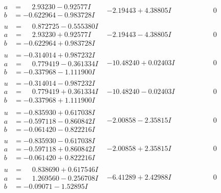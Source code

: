\documentclass[1p]{elsarticle_modified}
\theoremstyle{definition}
\begin{document}
$$\begin{array}{c|c|c}
\begin{aligned}
a &= \phantom{-}2.93230 - 0.92577 I \\
b &= -0.622964 - 0.983728 I\end{aligned}
 & -2.19443 + 4.38805 I & \phantom{-0.000000 } 0 \\ \hline\begin{aligned}
u &= \phantom{-}0.872725 - 0.555380 I \\
a &= \phantom{-}2.93230 + 0.92577 I \\
b &= -0.622964 + 0.983728 I\end{aligned}
 & -2.19443 - 4.38805 I & \phantom{-0.000000 } 0 \\ \hline\begin{aligned}
u &= -0.314014 + 0.987232 I \\
a &= \phantom{-}0.779419 - 0.361334 I \\
b &= -0.337968 - 1.111900 I\end{aligned}
 & -10.48240 + 0.02403 I & \phantom{-0.000000 } 0 \\ \hline\begin{aligned}
u &= -0.314014 - 0.987232 I \\
a &= \phantom{-}0.779419 + 0.361334 I \\
b &= -0.337968 + 1.111900 I\end{aligned}
 & -10.48240 - 0.02403 I & \phantom{-0.000000 } 0 \\ \hline\begin{aligned}
u &= -0.835930 + 0.617038 I \\
a &= -0.597118 - 0.860842 I \\
b &= -0.061420 - 0.822216 I\end{aligned}
 & -2.00858 - 2.35815 I & \phantom{-0.000000 } 0 \\ \hline\begin{aligned}
u &= -0.835930 - 0.617038 I \\
a &= -0.597118 + 0.860842 I \\
b &= -0.061420 + 0.822216 I\end{aligned}
 & -2.00858 + 2.35815 I & \phantom{-0.000000 } 0 \\ \hline\begin{aligned}
u &= \phantom{-}0.838690 + 0.617546 I \\
a &= \phantom{-}1.269560 - 0.256708 I \\
b &= -0.09071 - 1.52895 I\end{aligned}
 & -6.41289 + 2.42988 I & \phantom{-0.000000 } 0 \\ \hline\begin{aligned}

\end{aligned}
\end{array}$$
\end{document}
